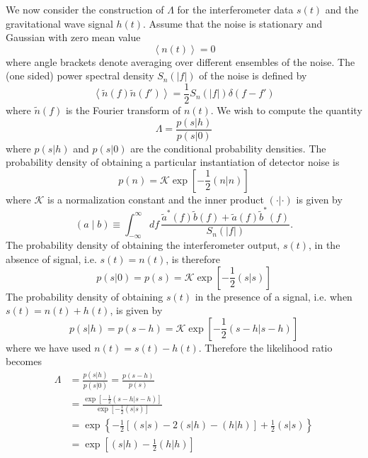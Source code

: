 We now consider the construction of $\Lambda$ for the interferometer data
$s(t)$ and the gravitational wave signal $h(t)$. Assume that the noise
is stationary and Gaussian with zero mean value
\begin{equation}
\left\langle n(t) \right\rangle = 0
\end{equation}
where angle brackets denote averaging over different ensembles of the
noise. The  (one sided) power spectral density $S_n(|f|)$ of the noise is
defined by
\begin{equation}
\left\langle \tilde{n}(f) \tilde{n}(f') \right\rangle = \frac{1}{2} S_n(|f|)
\delta(f-f')
\label{eq:ospsddef}
\end{equation}
where $\tilde{n}(f)$ is the Fourier transform of $n(t)$. We wish to compute
the quantity
\begin{equation}
\Lambda = \frac{p(s|h)}{p(s|0)}
\end{equation}
where $p(s|h)$ and $p(s|0)$ are the conditional probability densities. The
probability density of obtaining a particular instantiation of detector noise
is\cite{Finn:1992wt}
\begin{equation}
p(n) = \mathcal{K} \exp\left[-\frac{1}{2} (n|n)\right]
\end{equation}
where $\mathcal{K}$ is a normalization constant and the inner product
$(\cdot|\cdot)$ is given by
\begin{equation}
\label{eq:fullinnerproduct}
  (a\mid b) \equiv \int_{-\infty}^\infty df\,
  \frac{\tilde{a}^\ast(f)\tilde{b}(f)+\tilde{a}(f)\tilde{b}^\ast(f)}
       {S_n(|f|)}.
\end{equation}
The probability density of obtaining the interferometer output, $s(t)$, in the
absence of signal, i.e. $s(t) = n(t)$, is therefore
\begin{equation}
p(s|0) = p(s) = \mathcal{K} \exp\left[-\frac{1}{2} (s|s)\right]
\end{equation}
The probability density of obtaining $s(t)$ in the presence of a signal, i.e.
when $s(t) = n(t) + h(t)$, is given by 
\begin{equation}
p(s|h) = p(s-h) = \mathcal{K} \exp\left[-\frac{1}{2} (s-h|s-h)\right]
\end{equation}
where we have used $n(t) = s(t) - h(t)$. Therefore the likelihood ratio
becomes
\begin{equation}
\begin{split}
\Lambda &= \frac{p(s|h)}{p(s|0)} = \frac{p(s-h)}{p(s)} \\
&= \frac{\exp\left[-\frac{1}{2} (s-h|s-h)\right]}{\exp\left[-\frac{1}{2} (s|s)\right]} \\
&= \exp\left\{-\frac{1}{2}\left[(s|s) - 2(s|h) - (h|h)\right] + \frac{1}{2}(s|s)\right\} \\
&= \exp\left[(s|h) - \frac{1}{2}(h|h)\right]
\end{split}
\end{equation}
